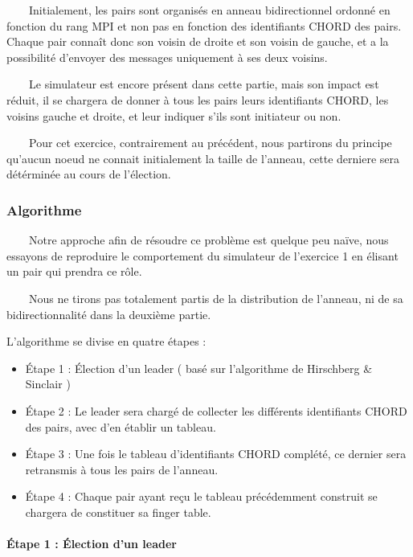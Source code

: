 \documentclass[
]{article}
\begin{document}
  Initialement, les pairs sont organisés en anneau bidirectionnel
ordonné en fonction du rang MPI et non pas en fonction des identifiants
CHORD des pairs. Chaque pair connaît donc son voisin de droite et son
voisin de gauche, et a la possibilité d'envoyer des messages uniquement
à ses deux voisins.

  Le simulateur est encore présent dans cette partie, mais son impact
est réduit, il se chargera de donner à tous les pairs leurs identifiants
CHORD, les voisins gauche et droite, et leur indiquer s'ils sont
initiateur ou non.

  Pour cet exercice, contrairement au précédent, nous partirons du
principe qu'aucun noeud ne connait initialement la taille de l'anneau,
cette derniere sera détérminée au cours de l'élection.

\hypertarget{algorithme}{%
\subsubsection{Algorithme}\label{algorithme}}

  Notre approche afin de résoudre ce problème est quelque peu naïve,
nous essayons de reproduire le comportement du simulateur de l'exercice
1 en élisant un pair qui prendra ce rôle.

  Nous ne tirons pas totalement partis de la distribution de l'anneau,
ni de sa bidirectionnalité dans la deuxième partie.

L'algorithme se divise en quatre étapes :

\begin{itemize}
\item
  Étape 1 : Élection d'un leader ( basé sur l'algorithme de Hirschberg
  \& Sinclair )
\item
  Étape 2 : Le leader sera chargé de collecter les différents
  identifiants CHORD des pairs, avec d'en établir un tableau.
\item
  Étape 3 : Une fois le tableau d'identifiants CHORD complété, ce
  dernier sera retransmis à tous les pairs de l'anneau.
\item
  Étape 4 : Chaque pair ayant reçu le tableau précédemment construit se
  chargera de constituer sa finger table.
\end{itemize}

\hypertarget{uxe9tape-1-uxe9lection-dun-leader}{%
\paragraph{Étape 1 : Élection d'un
leader}\label{uxe9tape-1-uxe9lection-dun-leader}}
\end{document}
